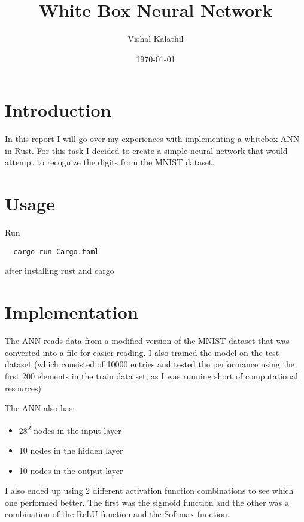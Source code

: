 \documentclass[a4paper]{article}
\author{Vishal Kalathil}
\date{\today}
\title{White Box Neural Network}
\begin{document}
\maketitle



\section{Introduction}
In this report I will go over my experiences with implementing a whitebox ANN in Rust.
For this task I decided to create a simple neural network that would attempt to recognize the digits from the MNIST dataset.

\section{Usage}
Run
\begin{verbatim}
  cargo run Cargo.toml
\end{verbatim}
after installing rust and cargo

\section{Implementation}
The ANN reads data from a modified version of the MNIST dataset that was converted into a file for easier reading. I also trained the model on the test dataset (which consisted of 10000 entries and tested the performance using the first 200 elements in the train data set, as I was running short of computational resources)

The ANN also has:
\begin{itemize}
\item 28\textsuperscript{2} nodes in the input layer
\item 10 nodes in the hidden layer
\item 10 nodes in the output layer
\end{itemize}
I also ended up using 2 different activation function combinations to see which one performed better.
The first was the sigmoid function and the other was a combination of the ReLU function and the Softmax function.
\newpage
\end{document}

